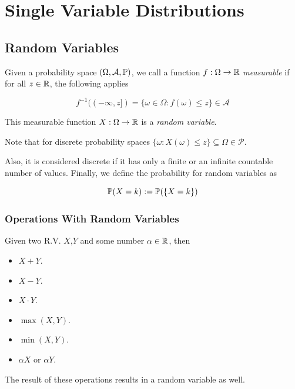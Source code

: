 \chapter{Single Variable Distributions}

\section{Random Variables}

Given a probability space \((\Omega, \mathcal{A}, \mathbb{P})\), we call a function \(f: \Omega \to \mathbb{R}\) \emph{measurable} if 
for all \(z \in \mathbb{R}\), the following applies 

\[
    f^{-1} ((- \infty, z ]) = \{\omega \in \Omega : f(\omega) \le z \} \in \mathcal{A}
\]

This measurable function \(X: \Omega \to \mathbb{R}\) is a \emph{random variable}.

Note that for discrete probability spaces \(\{\omega: X(\omega) \le z\} \subseteq \Omega \in \mathcal{P}\).

Also, it is considered discrete if it has only a finite or an infinite countable number of values. 
Finally, we define the probability for random variables as

\[
    \mathbb{P}(X = k) := \mathbb{P}(\{X = k\})
\]

\subsection{Operations With Random Variables}

Given two R.V. \(X\),\(Y\) and some number \(\alpha \in \mathbb{R}\), then

\begin{itemize}

    \item \(X + Y\).

    \item \(X - Y\).

    \item \(X \cdot Y\).

    \item \(\max(X,Y)\).

    \item \(\min(X,Y)\).

    \item \(\alpha X\) or \(\alpha Y\).

\end{itemize}

The result of these operations results in a random variable as well.

